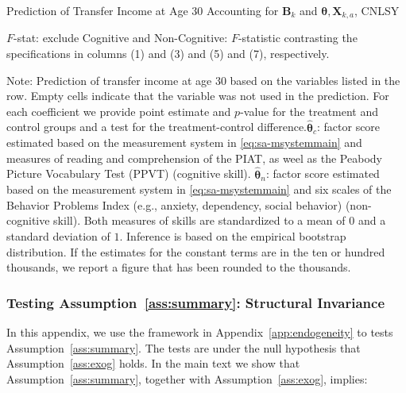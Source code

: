 \begin{table}
\begin{threeparttable}
\caption{Prediction of Transfer Income at Age 30 Accounting for $\bm{B}_k$ and $\bm{\theta}, \bm{X}_{k,a}$, CNLSY} \label{table:trincome}
\centering
\footnotesize

\begin{tablenotes}
\footnotesize
\item $F$-stat: exclude Cognitive and Non-Cognitive: $F$-statistic contrasting the specifications in columns (1) and (3) and (5) and (7), respectively.\\
\item Note: Prediction of transfer income at age 30 based on the variables listed in the row. Empty cells indicate that the variable was not used in the prediction. For each coefficient we provide point estimate and $p$-value for the treatment and control groups and a test for the treatment-control difference.$\hat{\bm{\theta}}_{c}$: factor score estimated based on the measurement system in \eqref{eq:sa-msystemmain} and measures of reading and comprehension of the PIAT, as weel as the Peabody Picture Vocabulary Test (PPVT) (cognitive skill). $\hat{\bm{\theta}}_{n}$: factor score estimated based on the measurement system in \eqref{eq:sa-msystemmain} and six scales of the Behavior Problems Index (e.g., anxiety, dependency, social behavior) (non-cognitive skill).  Both measures of skills are standardized to a mean of $0$ and a standard deviation of $1$. Inference is based on the empirical bootstrap distribution. If the estimates for the constant terms are in the ten or hundred thousands, we report a figure that has been rounded to the thousands.
\end{tablenotes}
\end{threeparttable}
\end{table}

\subsubsection{Testing Assumption~\ref{ass:summary}: Structural Invariance} \label{app:invariance}

In this appendix, we use the framework in Appendix~\ref{app:endogeneity} to tests Assumption~\ref{ass:summary}. The tests are under the null hypothesis that Assumption~\ref{ass:exog} holds. In the main text we show that Assumption~\ref{ass:summary}, together with Assumption~\ref{ass:exog}, implies:

